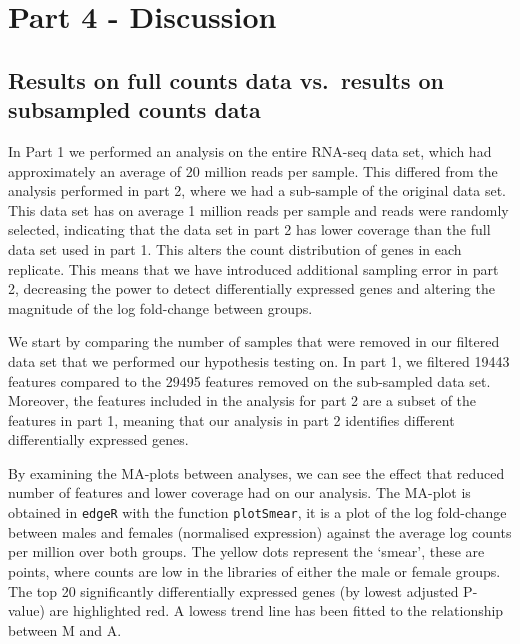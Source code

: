 \documentclass[]{article}
\begin{document}
\section{Part 4 - Discussion}\label{part-4---discussion}

\subsection{Results on full counts data vs.~results on subsampled counts
data}\label{results-on-full-counts-data-vs.results-on-subsampled-counts-data}

In Part 1 we performed an analysis on the entire RNA-seq data set, which
had approximately an average of 20 million reads per sample. This
differed from the analysis performed in part 2, where we had a
sub-sample of the original data set. This data set has on average 1
million reads per sample and reads were randomly selected, indicating
that the data set in part 2 has lower coverage than the full data set
used in part 1. This alters the count distribution of genes in each
replicate. This means that we have introduced additional sampling error
in part 2, decreasing the power to detect differentially expressed genes
and altering the magnitude of the log fold-change between groups.

We start by comparing the number of samples that were removed in our
filtered data set that we performed our hypothesis testing on. In part
1, we filtered 19443 features compared to the 29495 features removed on
the sub-sampled data set. Moreover, the features included in the
analysis for part 2 are a subset of the features in part 1, meaning that
our analysis in part 2 identifies different differentially expressed
genes.

By examining the MA-plots between analyses, we can see the effect that
reduced number of features and lower coverage had on our analysis. The
MA-plot is obtained in \texttt{edgeR} with the function
\texttt{plotSmear}, it is a plot of the log fold-change between males
and females (normalised expression) against the average log counts per
million over both groups. The yellow dots represent the `smear', these
are points, where counts are low in the libraries of either the male or
female groups. The top 20 significantly differentially expressed genes
(by lowest adjusted P-value) are highlighted red. A lowess trend line
has been fitted to the relationship between M and A.
\end{document}
